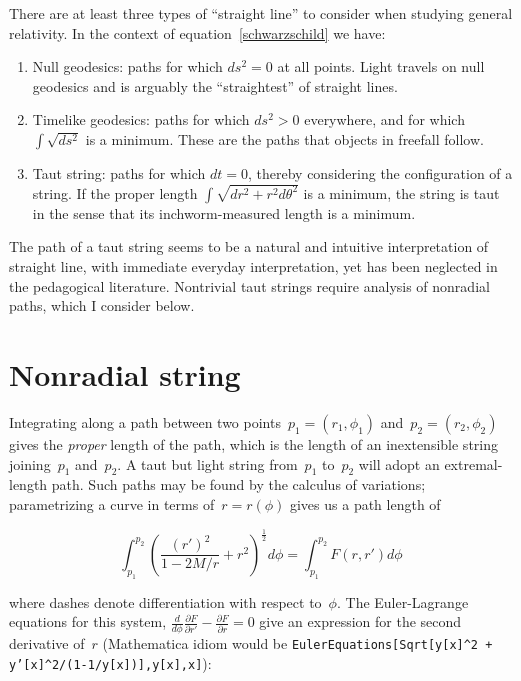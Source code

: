 \documentclass[review]{elsarticle}
\begin{document}
There are at least three types of ``straight line'' to consider when
studying general relativity.  In the context of
equation~\ref{schwarzschild} we have:

\begin{enumerate}
\item Null geodesics: paths for which $ds^2=0$ at all points.  Light
  travels on null geodesics and is arguably the ``straightest'' of
  straight lines.
\item Timelike geodesics: paths for which $ds^2>0$ everywhere, and for
  which $\int\sqrt{ds^2}$ is a minimum.  These are the paths that
  objects in freefall follow.
\item Taut string: paths for which $dt=0$, thereby considering the
  configuration of a string.  If the proper length
  $\int\sqrt{dr^2+r^2d\theta^2}$ is a minimum, the string is taut in
  the sense that its inchworm-measured length is a minimum.
\end{enumerate}

The path of a taut string seems to be a natural and intuitive
interpretation of straight line, with immediate everyday
interpretation, yet has been neglected in the pedagogical literature.
Nontrivial taut strings require analysis of nonradial paths, which I
consider below.

\section{Nonradial string}
Integrating along a path between two
points~$p_1=\left(r_1,\phi_1\right)$ and~$p_2=\left(r_2,\phi_2\right)$
gives the {\em proper} length of the path, which is the length of an
inextensible string joining~$p_1$ and~$p_2$.  A taut but light string
from~$p_1$ to~$p_2$ will adopt an extremal-length path.  Such paths
may be found by the calculus of variations; parametrizing a curve in
terms of~$r=r\left(\phi\right)$ gives us a path length of


\begin{equation}
  \int_{p_1}^{p_2}\left(\frac{\left(r'\right)^2}{1-2M/r} + r^2\right)^\frac{1}{2}d\phi=
  \int_{p_1}^{p_2}F\left(r,r'\right)d\phi
\end{equation}

\noindent where dashes denote differentiation with respect to~$\phi$.
The Euler-Lagrange equations for this system,
$\frac{d}{d\phi}\frac{\partial F}{\partial r'}-\frac{\partial
  F}{\partial r}=0$ give an expression for the second derivative
of~$r$ (Mathematica idiom would be {\tt EulerEquations[Sqrt[y[x]\^{}2
      + y'[x]\^{}2/(1-1/y[x])],y[x],x]}):
\end{document}
